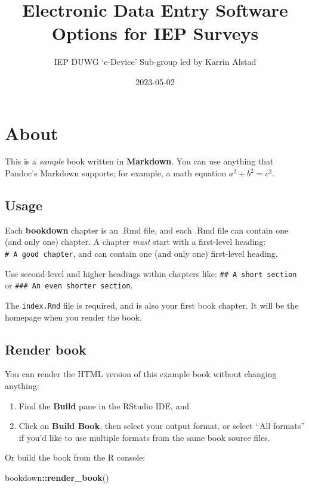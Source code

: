 \documentclass[
]{book}
\title{Electronic Data Entry Software Options for IEP Surveys}
\author{IEP DUWG `e-Device' Sub-group led by Karrin Alstad}
\date{2023-05-02}
\newenvironment{Shaded}{\begin{snugshade}}{\end{snugshade}}
\newcommand{\FunctionTok}[1]{\textcolor[rgb]{0.13,0.29,0.53}{\textbf{#1}}}
\newcommand{\NormalTok}[1]{#1}
\newcommand{\SpecialCharTok}[1]{\textcolor[rgb]{0.81,0.36,0.00}{\textbf{#1}}}
\theoremstyle{definition}
\theoremstyle{definition}
\theoremstyle{definition}
\theoremstyle{definition}
\theoremstyle{remark}
\begin{document}
\maketitle

{
\setcounter{tocdepth}{1}
\tableofcontents
}
\hypertarget{about}{%
\chapter{About}\label{about}}

This is a \emph{sample} book written in \textbf{Markdown}. You can use anything that Pandoc's Markdown supports; for example, a math equation \(a^2 + b^2 = c^2\).

\hypertarget{usage}{%
\section{Usage}\label{usage}}

Each \textbf{bookdown} chapter is an .Rmd file, and each .Rmd file can contain one (and only one) chapter. A chapter \emph{must} start with a first-level heading: \texttt{\#\ A\ good\ chapter}, and can contain one (and only one) first-level heading.

Use second-level and higher headings within chapters like: \texttt{\#\#\ A\ short\ section} or \texttt{\#\#\#\ An\ even\ shorter\ section}.

The \texttt{index.Rmd} file is required, and is also your first book chapter. It will be the homepage when you render the book.

\hypertarget{render-book}{%
\section{Render book}\label{render-book}}

You can render the HTML version of this example book without changing anything:

\begin{enumerate}
\def\labelenumi{\arabic{enumi}.}
\item
  Find the \textbf{Build} pane in the RStudio IDE, and
\item
  Click on \textbf{Build Book}, then select your output format, or select ``All formats'' if you'd like to use multiple formats from the same book source files.
\end{enumerate}

Or build the book from the R console:

\begin{Shaded}
\begin{Highlighting}[]
\NormalTok{bookdown}\SpecialCharTok{::}\FunctionTok{render\_book}\NormalTok{()}
\end{Highlighting}
\end{Shaded}
\end{document}
